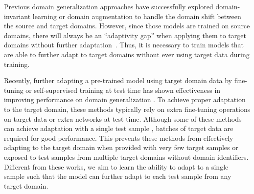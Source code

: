 \documentclass{article} \usepackage[table]{xcolor}
\begin{document}
Previous domain generalization approaches have successfully explored domain-invariant learning \citep{muandet2013domain,chattopadhyay2020learning} or domain augmentation \citep{shankar2018generalizing,zhou2020learning} to handle the domain shift between the source and target domains. 
However, since those models are trained on source domains, there will always be an ``adaptivity gap'' when applying them to target domains without further adaptation~\citep{dubey2021adaptive}.
Thus, it is necessary to train models that are able to further adapt to target domains without ever using target data during training.


Recently, further adapting a pre-trained model using target domain data by fine-tuning or self-supervised training at test time has shown effectiveness in improving performance on domain generalization \citep{sun2020test,wang2021tent}.
To achieve proper adaptation to the target domain, these methods typically rely on 
extra fine-tuning operations on target data or extra networks \citep{dubey2021adaptive} at test time.
Although some of these methods can achieve adaptation with a single test sample \citep{d2019learning,sun2020test,banerjee2021self}, batches of target data are required for good performance.
This prevents these methods from 
effectively adapting
to the target domain when provided with very few target samples or exposed to test samples from multiple target domains without domain identifiers.
Different from these works, we aim to learn the ability to adapt to a single sample such that the model can further adapt to each test sample from any target domain.
\end{document}
